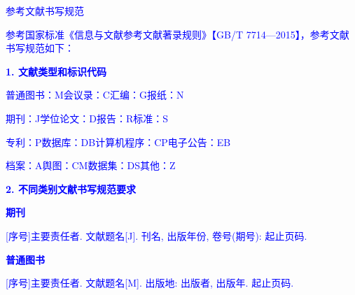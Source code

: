 

\renewcommand*{\bibfont}{\zihao{5}}
\setlength{\bibitemsep}{0ex}
\setlength{\bibnamesep}{0ex}
\setlength{\bibinitsep}{0ex}
\renewcommand{\baselinestretch}{1.2}
\setlength{\biblabelsep}{0.5mm}
\renewcommand{\itemcmd}{
  \addvspace{\bibitemsep} %
  \mkgbnumlabel{\printfield{labelnumber}}
  \hspace{\biblabelsep}}

\textcolor{blue}{参考文献书写规范}

\textcolor{blue}{参考国家标准《信息与文献参考文献著录规则》【GB/T 7714—2015】，参考文献书写规范如下：}

\textcolor{blue}{\textbf{1. 文献类型和标识代码}}

\textcolor{blue}{普通图书：M}\qquad\textcolor{blue}{会议录：C}\qquad\textcolor{blue}{汇编：G}\qquad\textcolor{blue}{报纸：N}

\textcolor{blue}{期刊：J}\qquad\textcolor{blue}{学位论文：D}\qquad\textcolor{blue}{报告：R}\qquad\textcolor{blue}{标准：S}

\textcolor{blue}{专利：P}\qquad\textcolor{blue}{数据库：DB}\qquad\textcolor{blue}{计算机程序：CP}\qquad\textcolor{blue}{电子公告：EB}

\textcolor{blue}{档案：A}\qquad\textcolor{blue}{舆图：CM}\qquad\textcolor{blue}{数据集：DS}\qquad\textcolor{blue}{其他：Z}

\textcolor{blue}{\textbf{2. 不同类别文献书写规范要求}}

\textcolor{blue}{\textbf{期刊}}

\noindent\textcolor{blue}{[序号]主要责任者. 文献题名[J]. 刊名, 出版年份, 卷号(期号): 起止页码. }


\textcolor{blue}{\textbf{普通图书}}

\noindent\textcolor{blue}{[序号]主要责任者. 文献题名[M]. 出版地: 出版者, 出版年. 起止页码. }
\cite{Raymer1992Aircraft}

